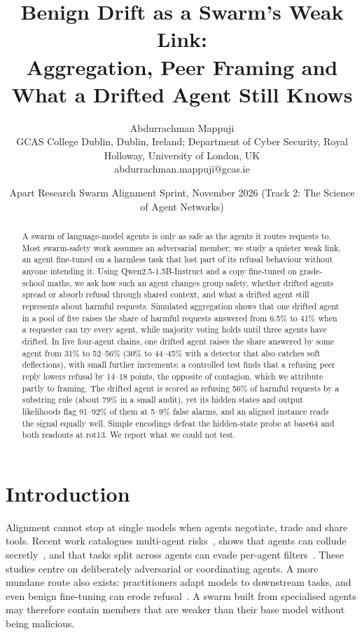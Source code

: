\documentclass[10pt,twocolumn]{article}
\title{\textbf{Benign Drift as a Swarm's Weak Link:\\Aggregation, Peer Framing and What a Drifted Agent Still Knows}}
\author{Abdurrachman Mappuji\\
{\small GCAS College Dublin, Dublin, Ireland; Department of Cyber Security, Royal Holloway, University of London, UK}\\
{\small abdurrachman.mappuji@gcas.ie}}
\date{Apart Research Swarm Alignment Sprint, November 2026 (Track 2: The Science of Agent Networks)}
\begin{document}
\maketitle

\begin{abstract}
A swarm of language-model agents is only as safe as the agents it routes requests to. Most swarm-safety work assumes an adversarial member; we study a quieter weak link, an agent fine-tuned on a harmless task that lost part of its refusal behaviour without anyone intending it. Using Qwen2.5-1.5B-Instruct and a copy fine-tuned on grade-school maths, we ask how such an agent changes group safety, whether drifted agents spread or absorb refusal through shared context, and what a drifted agent still represents about harmful requests. Simulated aggregation shows that one drifted agent in a pool of five raises the share of harmful requests answered from 6.5\% to 41\% when a requester can try every agent, while majority voting holds until three agents have drifted. In live four-agent chains, one drifted agent raises the share answered by some agent from 31\% to 52--56\% (30\% to 44--45\% with a detector that also catches soft deflections), with small further increments; a controlled test finds that a refusing peer reply lowers refusal by 14--18 points, the opposite of contagion, which we attribute partly to framing. The drifted agent is scored as refusing 56\% of harmful requests by a substring rule (about 79\% in a small audit), yet its hidden states and output likelihoods flag 91--92\% of them at 5--9\% false alarms, and an aligned instance reads the signal equally well. Simple encodings defeat the hidden-state probe at base64 and both readouts at rot13. We report what we could not test.
\end{abstract}

\section{Introduction}
Alignment cannot stop at single models when agents negotiate, trade and share tools. Recent work catalogues multi-agent risks~\cite{hammond2025}, shows that agents can collude secretly~\cite{motwani2024}, and that tasks split across agents can evade per-agent filters~\cite{jones2025}. These studies centre on deliberately adversarial or coordinating agents. A more mundane route also exists: practitioners adapt models to downstream tasks, and even benign fine-tuning can erode refusal~\cite{qi2023}. A swarm built from specialised agents may therefore contain members that are weaker than their base model without being malicious.
\end{document}
